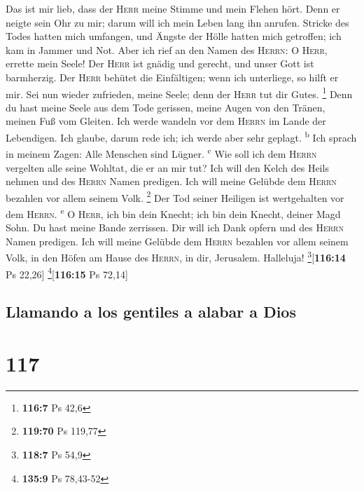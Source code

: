  Das ist mir lieb, dass der \textsc{Herr} meine Stimme und
mein Flehen hört.  Denn er neigte sein Ohr zu mir; darum
will ich mein Leben lang ihn anrufen.  Stricke des Todes
hatten mich umfangen, und Ängste der Hölle hatten mich getroffen; ich
kam in Jammer und Not.  Aber ich rief an den Namen des
\textsc{Herrn}: O \textsc{Herr}, errette mein Seele!  Der
\textsc{Herr} ist gnädig und gerecht, und unser Gott ist barmherzig.
 Der \textsc{Herr} behütet die Einfältigen; wenn ich
unterliege, so hilft er mir.  Sei nun wieder zufrieden,
meine Seele; denn der \textsc{Herr} tut dir Gutes. \footnote{\textbf{116:7}
  Ps 42,6}  Denn du hast meine Seele aus dem Tode
gerissen, meine Augen von den Tränen, meinen Fuß vom Gleiten.
 Ich werde wandeln vor dem \textsc{Herrn} im Lande der
Lebendigen.  Ich glaube, darum rede ich; ich werde aber
sehr geplagt. \textsuperscript{b}  Ich sprach in meinem
Zagen: Alle Menschen sind Lügner. \textsuperscript{c} 
Wie soll ich dem \textsc{Herrn} vergelten alle seine Wohltat, die er an
mir tut?  Ich will den Kelch des Heils nehmen und des
\textsc{Herrn} Namen predigen.  Ich will meine Gelübde
dem \textsc{Herrn} bezahlen vor allem seinem Volk. \footnote{\textbf{119:70}
  Ps 119,77}  Der Tod seiner Heiligen ist wertgehalten
vor dem \textsc{Herrn}. \textsuperscript{e}  O
\textsc{Herr}, ich bin dein Knecht; ich bin dein Knecht, deiner Magd
Sohn. Du hast meine Bande zerrissen.  Dir will ich Dank
opfern und des \textsc{Herrn} Namen predigen.  Ich will
meine Gelübde dem \textsc{Herrn} bezahlen vor allem seinem Volk,
 in den Höfen am Hause des \textsc{Herrn}, in dir,
Jerusalem. Halleluja! \footnote{\textbf{118:7} Ps 54,9}{[}\textbf{116:14}
Ps 22,26{]} \footnote{\textbf{135:9} Ps 78,43-52}{[}\textbf{116:15} Ps
72,14{]}

\hypertarget{llamando-a-los-gentiles-a-alabar-a-dios}{%
\subsection{Llamando a los gentiles a alabar a
Dios}\label{llamando-a-los-gentiles-a-alabar-a-dios}}

\hypertarget{section-116}{%
\section{117}\label{section-116}}

